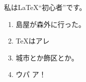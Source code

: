 \documentclass[a4paper]{jsarticle}
\begin{document}
私は{\LaTeX}“初心者”です。

\renewcommand{\theenumi}{\ajLabel\ajMaruKaku{enumi}}
\begin{enumerate}
\item {}島屋が森外に行った。
\item {\TeX}は\●ア\●レ
\item {}城市とか飾区とか。
\item ウパ ア！\ajSnowman
\end{enumerate}
\end{document}
